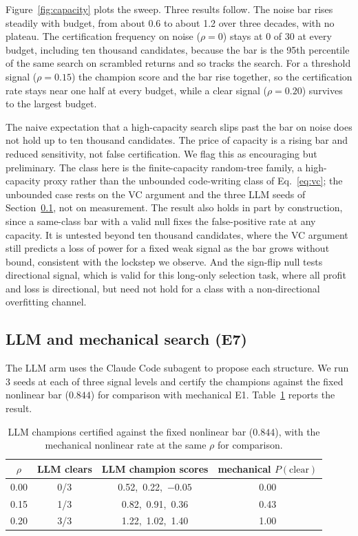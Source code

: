 \documentclass[11pt]{article}
\begin{document}
Figure~\ref{fig:capacity} plots the sweep. Three results follow. The noise bar rises steadily with budget, from about 0.6 to about 1.2 over
three decades, with no plateau. The certification frequency on noise ($\rho=0$) stays at 0 of 30 at
every budget, including ten thousand candidates, because the bar is the 95th percentile of the same
search on scrambled returns and so tracks the search. For a threshold signal ($\rho=0.15$) the champion score
and the bar rise together, so the certification rate stays near one half at every budget, while a
clear signal ($\rho=0.20$) survives to the largest budget.

The naive expectation that a high-capacity search slips past the bar on noise does not hold up to ten
thousand candidates. The price of capacity is a rising bar and reduced sensitivity, not false
certification. We flag this as encouraging but preliminary. The class here is the finite-capacity
random-tree family, a high-capacity proxy rather than the unbounded code-writing class of
Eq.~\eqref{eq:vc}; the unbounded case rests on the VC argument and the three LLM seeds of
Section~\ref{sec:e7}, not on measurement. The result also holds in part by construction, since a
same-class bar with a valid null fixes the false-positive rate at any capacity. It is untested beyond
ten thousand candidates, where the VC argument still predicts a loss of power for a fixed weak signal
as the bar grows without bound, consistent with the lockstep we observe. And the sign-flip null tests
directional signal, which is valid for this long-only selection task, where all profit and loss is
directional, but need not hold for a class with a non-directional overfitting channel.

\subsection{LLM and mechanical search (E7)}
\label{sec:e7}

The LLM arm uses the Claude Code subagent to propose each structure. We run 3 seeds at each of three
signal levels and certify the champions against the fixed nonlinear bar ($0.844$) for comparison with
mechanical
E1. Table~\ref{tab:llm} reports the result.

\begin{table}[htbp]
\centering
\caption{LLM champions certified against the fixed nonlinear bar ($0.844$), with the mechanical
nonlinear rate at the same $\rho$ for comparison.}
\label{tab:llm}
\small
\begin{tabular}{c c c c}
\toprule
$\rho$ & LLM clears & LLM champion scores & mechanical $P(\text{clear})$ \\
\midrule
0.00 & 0/3 & 0.52,\ 0.22,\ $-0.05$ & 0.00 \\
0.15 & 1/3 & 0.82,\ 0.91,\ 0.36 & 0.43 \\
0.20 & 3/3 & 1.22,\ 1.02,\ 1.40 & 1.00 \\
\bottomrule
\end{tabular}
\end{table}
\end{document}
